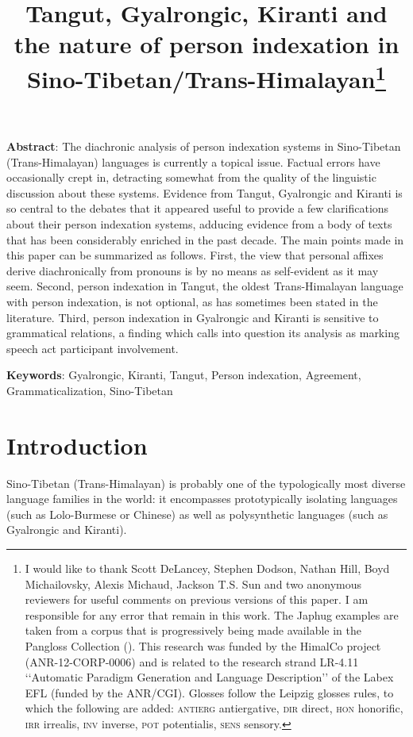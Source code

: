 \documentclass[oldfontcommands,oneside,a4paper,11pt]{article}
\begin{document}
 
\title{Tangut, Gyalrongic, Kiranti and the nature of person indexation in Sino-Tibetan/Trans-Himalayan\footnote{I would like to thank Scott DeLancey, Stephen Dodson, Nathan Hill, Boyd Michailovsky, Alexis Michaud, Jackson T.S. Sun and two anonymous reviewers for useful comments on previous versions of this paper. I am responsible for any error that remain in this work. The Japhug examples are taken from a corpus that is progressively being made available in the Pangloss Collection (\citealt{michailovsky14pangloss}). This research was funded by the HimalCo project (ANR-12-CORP-0006) and is related to the research strand LR-4.11 ‘‘Automatic Paradigm Generation and Language Description’’ of the Labex EFL (funded by the ANR/CGI). Glosses follow the Leipzig glosses rules, to which the following are added: \textsc{antierg} antiergative, \textsc{dir} direct, \textsc{hon} honorific, \textsc{irr} irrealis, \textsc{inv} inverse, \textsc{pot} potentialis, \textsc{sens} sensory.}}
\maketitle

\textbf{Abstract}: The diachronic analysis of person indexation systems in Sino-Tibetan (Trans-Himalayan) languages is currently a topical issue. Factual errors have occasionally crept in, detracting somewhat from the quality of the linguistic discussion about these systems. Evidence from Tangut, Gyalrongic and Kiranti is so central to the debates that it appeared useful to provide a few clarifications about their person indexation systems, adducing evidence from a body of texts that has been considerably enriched in the past decade. The main points made in this paper can be summarized as follows. First, the view that personal affixes derive diachronically from pronouns is by no means as self-evident as it may seem. Second, person indexation in Tangut, the oldest Trans-Himalayan language with person indexation, is not optional, as has sometimes been stated in the literature. Third, person indexation in Gyalrongic and Kiranti is sensitive to grammatical relations, a finding which calls into question its analysis as marking speech act participant involvement.

\textbf{Keywords}: Gyalrongic, Kiranti, Tangut, Person indexation, Agreement, Grammaticalization, Sino-Tibetan

\section{Introduction}
Sino-Tibetan (Trans-Himalayan) is probably one of the typologically most diverse language families in the world: it encompasses prototypically isolating languages (such as Lolo-Burmese or Chinese) as well as polysynthetic languages (such as Gyalrongic and Kiranti). 
\end{document}
